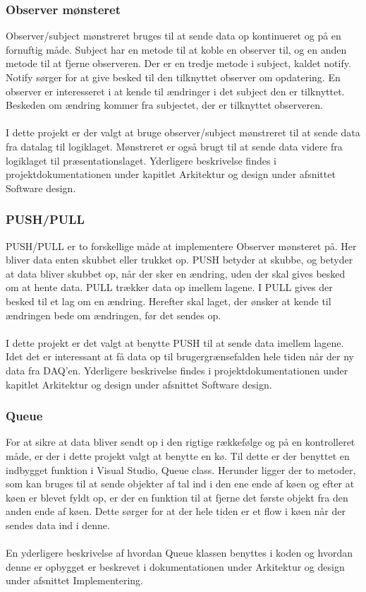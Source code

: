 \subsubsection{Observer mønsteret}
Observer/subject mønstreret bruges til at sende data op kontinueret og på en fornuftig måde. Subject har en metode til at koble en observer til, og en anden metode til at fjerne observeren. Der er en tredje metode i subject, kaldet notify. Notify sørger for at give besked til den tilknyttet observer om opdatering. En observer er interesseret i at kende til ændringer i det subject den er tilknyttet. Beskeden om ændring kommer fra subjectet, der er tilknyttet observeren. \\
\\
I dette projekt er der valgt at bruge observer/subject mønstreret til at sende data fra datalag til logiklaget. Mønstreret er også brugt til at sende data videre fra logiklaget til præsentationslaget. Yderligere beskrivelse findes i projektdokumentationen under kapitlet Arkitektur og design under afsnittet Software design. 
\subsubsection{PUSH/PULL}
PUSH/PULL er to forskellige måde at implementere Observer mønsteret på. Her bliver data enten skubbet eller trukket op. PUSH betyder at skubbe, og betyder at data bliver skubbet op, når der sker en ændring, uden der skal gives besked om at hente data. PULL trækker data op imellem lagene. I PULL gives der besked til et lag om en ændring. Herefter skal laget, der ønsker at kende til ændringen bede om ændringen, før det sendes op.\\
\\
I dette projekt er det valgt at benytte PUSH til at sende data imellem lagene. Idet det er interessant at få data op til brugergrænsefalden hele tiden når der ny data fra DAQ’en. Yderligere beskrivelse findes i projektdokumentationen under kapitlet Arkitektur og design under afsnittet Software design. 
\subsubsection{Queue}
For at sikre at data bliver sendt op i den rigtige rækkefølge og på en kontrolleret måde, er der i dette projekt valgt at benytte en kø. Til dette er der benyttet en indbygget funktion i Visual Studio, Queue class. Herunder ligger der to metoder, som kan bruges til at sende objekter af tal ind i den ene ende af køen og efter at køen er blevet fyldt op, er der en funktion til at fjerne det første objekt fra den anden ende af køen. Dette sørger for at der hele tiden er et flow i køen når der sendes data ind i denne. \\
\\
En yderligere beskrivelse af hvordan Queue klassen benyttes i koden og hvordan denne er opbygget er beskrevet i dokumentationen under Arkitektur og design under afsnittet Implementering.
